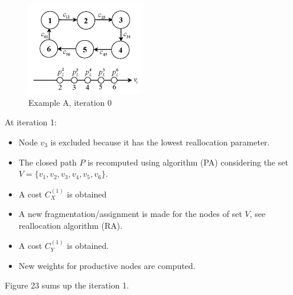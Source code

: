 \begin{figure}[h]
    \centering
    \includegraphics[height=4cm, keepaspectratio]{images/exempleA-it0}
    \caption{Example A, iteration 0}
    \label{fig:exempleA-it0}
\end{figure}
At iteration 1:
\begin{itemize}
    \item Node $v_3$ is excluded because it has the lowest reallocation parameter.
    \item The closed path $P$ is recomputed using algorithm (PA) considering the set $V = \{v_1,v_2,v_3,v_4, v_5, v_6\}$. 
    \item A cost $C^{(1)}_X$ is obtained
    \item A new fragmentation/assignment is made for the nodes of set $V$, see reallocation algorithm (RA).
    \item A cost $C^{(1)}_Y$ is obtained.
    \item New weights for productive nodes are computed.
\end{itemize}
Figure 23 sums up the iteration 1.

